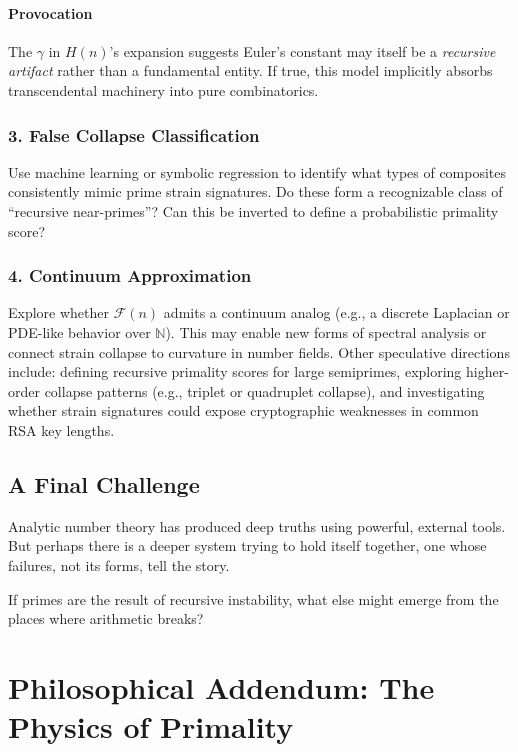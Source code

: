 \documentclass[11pt]{article}
\begin{document}
\paragraph{Provocation}
The $\gamma$ in $H(n)$'s expansion suggests Euler's constant may itself be a \textit{recursive artifact} rather than a fundamental entity. If true, this model implicitly absorbs transcendental machinery into pure combinatorics.

\subsubsection*{3. False Collapse Classification}

Use machine learning or symbolic regression to identify what types of composites consistently mimic prime strain signatures. Do these form a recognizable class of “recursive near-primes”? Can this be inverted to define a probabilistic primality score?

\subsubsection*{4. Continuum Approximation}

Explore whether $\mathcal{F}(n)$ admits a continuum analog (e.g., a discrete Laplacian or PDE-like behavior over $\mathbb{N}$). This may enable new forms of spectral analysis or connect strain collapse to curvature in number fields. Other speculative directions include: defining recursive primality scores for large semiprimes, exploring higher-order collapse patterns (e.g., triplet or quadruplet collapse), and investigating whether strain signatures could expose cryptographic weaknesses in common RSA key lengths.


\subsection{A Final Challenge}

Analytic number theory has produced deep truths using powerful, external tools. But perhaps there is a deeper system trying to hold itself together, one whose failures, not its forms, tell the story.

If primes are the result of recursive instability, what else might emerge from the places where arithmetic breaks?

\section*{Philosophical Addendum: The Physics of Primality}
\end{document}
